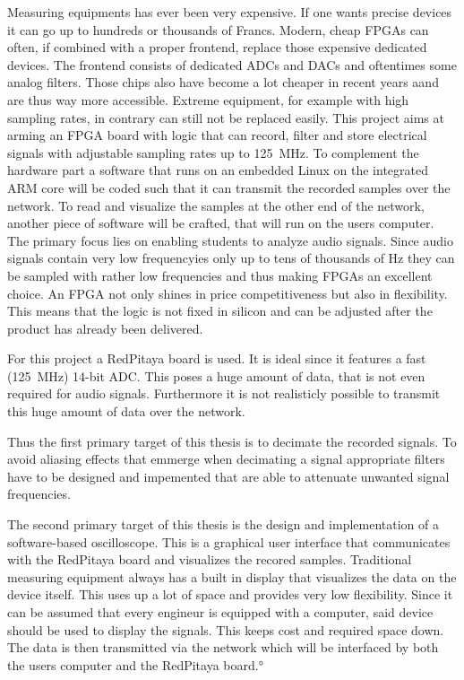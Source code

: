Measuring  equipments  has ever  been  very  expensive. If one  wants  precise
devices it can  go up to hundreds or thousands  of Francs. Modern, cheap FPGAs
can  often,  if combined  with  a  proper  frontend, replace  those  expensive
dedicated  devices.  The  frontend consists  of  dedicated ADCs  and DACs  and
oftentimes some analog filters. Those chips also  have become a lot cheaper in
recent  years aand  are  thus  way more  accessible.   Extreme equipment,  for
example  with high  sampling  rates, in  contrary can  still  not be  replaced
easily.  This project aims at arming an FPGA board with logic that can record,
filter  and store  electrical signals  with  adjustable sampling  rates up  to
\SI{125}{\mega\hertz}. To complement the hardware part a software that runs on
an embedded Linux  on the integrated ARM  core will be coded such  that it can
transmit the  recorded samples over  the network.   To read and  visualize the
samples at  the other end  of the network, another  piece of software  will be
crafted,  that will  run on  the users  computer.  The  primary focus  lies on
enabling students to  analyze audio signals. Since audio  signals contain very
low  frequencyies only  up to  tens of  thousands of  \si{\hertz} they  can be
sampled with rather low frequencies and thus making FPGAs an excellent choice.
An FPGA  not only  shines in  price competitiveness  but also  in flexibility.
This means that  the logic is not  fixed in silicon and can  be adjusted after
the product has already been delivered.

For this project  a RedPitaya board is  used. It is ideal since  it features a
fast (\SI{125}{\mega\hertz})  14-bit ADC. This  poses a  huge amount  of data,
that is not even required for audio signals. Furthermore it is not realisticly
possible to transmit this huge amount of data over the network.

Thus  the first  primary target  of this  thesis is  to decimate  the recorded
signals. To  avoid aliasing  effects  that emmerge  when  decimating a  signal
appropriate  filters have  to  be designed  and impemented  that  are able  to
attenuate unwanted signal frequencies.

The second primary  target of this thesis is the  design and implementation of
a  software-based  oscilloscope. This  is  a  graphical  user  interface  that
communicates  with the  RedPitaya board  and visualizes  the recored  samples.
Traditional measuring equipment always has  a built in display that visualizes
the data on the  device itself. This uses up a lot of  space and provides very
low flexibility.  Since it can be assumed that every engineur is equipped with
a computer, said device should be used to display the signals. This keeps cost
and required space  down.  The data is then transmitted  via the network which
will be interfaced by both the users computer and the RedPitaya board.°
